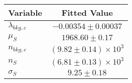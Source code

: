 \begin{tabular}[t]{lc}
\hline
Variable &Fitted Value\\
\hline\hline
$\lambda_{bkg,c}$&$-0.00354\pm0.00037$\\
\hline
$\mu_{S}$&$1968.60\pm0.17$\\
\hline
$n_{bkg,c}$&$(9.82\pm0.14)\times 10^3$\\
\hline
$n_{S}$&$(6.81\pm0.13)\times 10^3$\\
\hline
$\sigma_{S}$&$9.25\pm0.18$\\
\hline
\end{tabular}